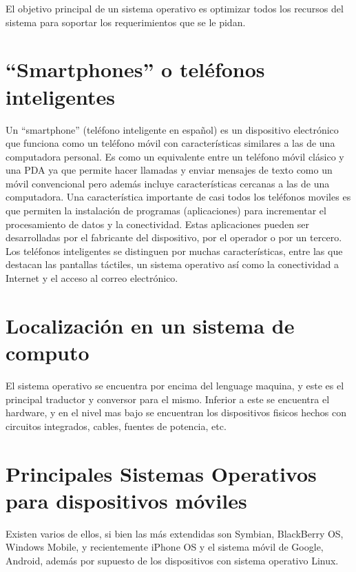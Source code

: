 \documentclass{bmcart}
\begin{document}
El objetivo principal de un sistema operativo es optimizar todos los recursos del sistema para soportar los requerimientos que se le pidan.\cite{tanenbaum1998sistemas}\cite{luis2001sistemas}


\section*{“Smartphones” o teléfonos inteligentes}

Un “smartphone” (teléfono inteligente en español) es un dispositivo electrónico que
funciona como un teléfono móvil con características similares a las de una computadora
personal. Es como un equivalente entre un teléfono móvil clásico y una PDA
ya que permite hacer llamadas y enviar mensajes de texto como un móvil
convencional pero además incluye características cercanas a las de una computadora. 
Una característica importante de casi todos los teléfonos moviles es que
permiten la instalación de programas (aplicaciones) para incrementar el procesamiento de datos y la
conectividad. Estas aplicaciones pueden ser desarrolladas por el fabricante del
dispositivo, por el operador o por un tercero.
Los teléfonos inteligentes se distinguen por muchas características, entre las que
destacan las pantallas táctiles, un sistema operativo así como la conectividad a
Internet y el acceso al correo electrónico.\cite{del2009sistemas}


\section*{Localización en un sistema de computo}

El sistema operativo se encuentra por encima del lenguage maquina, y este es el principal traductor y conversor para el mismo.
Inferior a este se encuentra el hardware, y en el nivel mas bajo se encuentran los dispositivos fisicos hechos con circuitos integrados, cables, fuentes de potencia, etc.\cite{tanenbaum2003sistemas}

\newpage
\section*{Principales Sistemas Operativos para dispositivos móviles}

Existen varios de ellos, si bien las más extendidas son Symbian, BlackBerry
OS, Windows Mobile, y recientemente iPhone OS y el sistema móvil de Google,
Android, además por supuesto de los dispositivos con sistema operativo Linux.\cite{alonsodispositivos}\cite{del2009sistemas}
\end{document}
